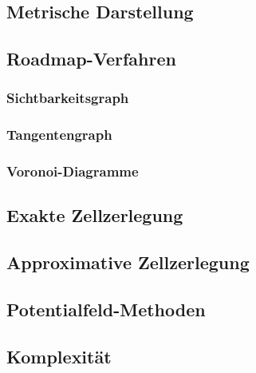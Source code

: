 \documentclass[a4paper, 11pt, accentcolor = tud3b]{tudreport}
\begin{document}
			\subsection{Metrische Darstellung} %

			\subsection{Roadmap-Verfahren} %

				\subsubsection{Sichtbarkeitsgraph} %

				\subsubsection{Tangentengraph} %

				\subsubsection{Voronoi-Diagramme} %

			\subsection{Exakte Zellzerlegung} %

			\subsection{Approximative Zellzerlegung} %

			\subsection{Potentialfeld-Methoden} %

			\subsection{Komplexität} %
\end{document}
